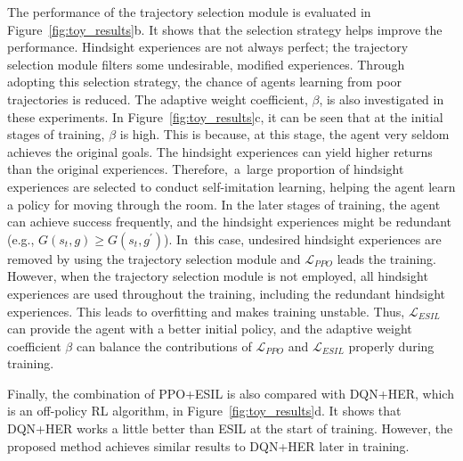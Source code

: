 The performance of the trajectory selection module is evaluated in Figure~\ref{fig:toy_results}b. It shows that the selection strategy helps improve the performance. Hindsight experiences are not always perfect; the trajectory selection module filters some undesirable, modified experiences. Through adopting this selection strategy, the chance of agents learning from poor trajectories is reduced. The adaptive weight coefficient, $\beta$, is also investigated in these experiments. {In Figure~\ref{fig:toy_results}c, it can be seen that at the initial stages of training, $\beta$ is high}. {This is because, at this stage, the agent very seldom achieves the original goals}. The hindsight experiences can yield higher returns than the original experiences. {Therefore,~a~large proportion of hindsight experiences are selected to conduct self-imitation learning, helping the agent learn a policy for moving through the room}. In the later stages of training, the agent can achieve success frequently, and the hindsight experiences might be redundant (e.g., $G(s_{t}, g)\geq G(s_{t}, g^{\prime})$). In~this case, undesired hindsight experiences are removed by using the trajectory selection module and $\mathcal{L}_{PPO}$ leads the training. However, when the trajectory selection module is not employed, all hindsight experiences are used throughout the training, including the redundant hindsight experiences. This leads to overfitting and makes training unstable. Thus, $\mathcal{L}_{ESIL}$ can provide the agent with a better initial policy, and the adaptive weight coefficient $\beta$ can balance the contributions of $\mathcal{L}_{PPO}$ and $\mathcal{L}_{ESIL}$ properly during training.

Finally, {the combination of PPO+ESIL is also compared with DQN+HER,} which is an off-policy RL algorithm, in Figure~\ref{fig:toy_results}d. It shows that DQN+HER works a little better than ESIL at the {start of training}. However, the proposed method achieves similar results to DQN+HER later in training.


